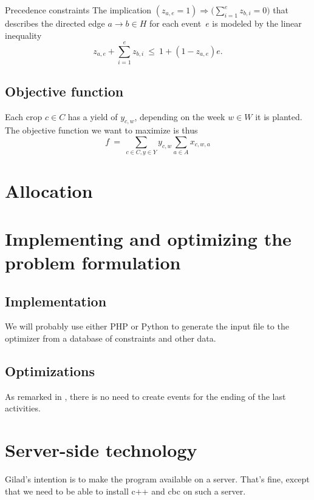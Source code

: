\documentclass[11pt,reqno]{amsart}
\newcommand{\lra}{\longrightarrow}
\numberwithin{equation}{section}
\begin{document}
\begin{mydesc}
\item[Precedence constraints] The implication $(z_{a,e}=1) \Longrightarrow
  \big(\sum_{i=1}^{e} z_{b,i}=0\big)$ that describes the directed edge $a\lra b\in H$ for
  each event~$e$ is modeled by the linear inequality
  \begin{equation}
     z_{a,e} + \sum_{i=1}^e z_{b,i}
     \ \le \
     1+(1-z_{a,e})e.
  \end{equation}

\end{mydesc}

\subsection{Objective function}

Each crop $c\in C$ has a yield of  $y_{c,w}$, depending on the week
$w\in W$ it is planted. 
The objective function we want to  maximize is thus
\[
   f 
   \ = \
   \sum_{c\in C, y\in Y} y_{c,w} \sum_{a\in A} x_{c,w,a}
\]


\section{Allocation}


\section{Implementing and optimizing the problem formulation}

\subsection{Implementation}

We will probably use either PHP or Python to generate the input file to the optimizer from
a database of constraints and other data.

\subsection{Optimizations}
As remarked in \cite{artigues-etal11}, there is no need to create
events for the ending of the last activities. 

\section{Server-side technology}

Gilad's intention is to make the program available on a server. That's
fine, except that we need to be able to install c++ and cbc on such a server.



\end{document}
